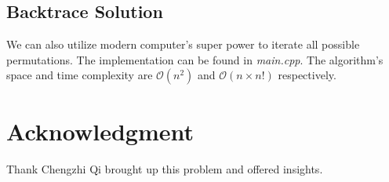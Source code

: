 \documentclass[12pt]{article}
\begin{document}
\subsection{Backtrace Solution}
We can also utilize modern computer's super power to iterate all possible permutations. The implementation can be found in \textit{main.cpp}. The algorithm's space and time complexity are $\mathcal{O}\left( n^2 \right)$ and $\mathcal{O}\left( n \times n!\right)$ respectively. \\

\section{Acknowledgment}
Thank Chengzhi Qi brought up this problem and offered insights.
\end{document}

